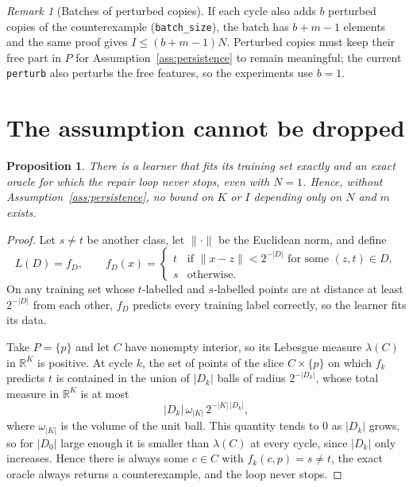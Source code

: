 \documentclass[11pt]{article}
\newtheorem{proposition}[theorem]{Proposition}
\theoremstyle{definition}
\theoremstyle{remark}
\newtheorem{remark}[theorem]{Remark}
\newcommand{\R}{\mathbb{R}}
\begin{document}
\begin{remark}[Batches of perturbed copies]
If each cycle also adds $b$ perturbed copies of the counterexample (\texttt{batch\_size}),
the batch has $b+m-1$ elements and the same proof gives $I\le(b+m-1)N$.
Perturbed copies must keep their free part in $P$ for Assumption~\ref{ass:persistence} to
remain meaningful; the current \texttt{perturb} also perturbs the free features, so the
experiments use $b=1$.
\end{remark}

\section{The assumption cannot be dropped}

\begin{proposition}\label{prop:nobound}
There is a learner that fits its training set exactly and an exact oracle for which the
repair loop never stops, even with $N=1$.
Hence, without Assumption~\ref{ass:persistence}, no bound on $K$ or $I$ depending only on
$N$ and $m$ exists.
\end{proposition}

\begin{proof}
Let $s\ne t$ be another class, let $\|\cdot\|$ be the Euclidean norm, and define
\[
  L(D)=f_D,\qquad
  f_D(x)=\begin{cases}
    t & \text{if } \|x-z\|<2^{-|D|} \text{ for some } (z,t)\in D,\\
    s & \text{otherwise.}
  \end{cases}
\]
On any training set whose $t$-labelled and $s$-labelled points are at distance at least
$2^{-|D|}$ from each other, $f_D$ predicts every training label correctly, so the
learner fits its data.

Take $P=\{p\}$ and let $C$ have nonempty interior, so its Lebesgue measure $\lambda(C)$ in
$\R^{K}$ is positive.
At cycle $k$, the set of points of the slice $C\times\{p\}$ on which $f_k$ predicts $t$ is
contained in the union of $|D_k|$ balls of radius $2^{-|D_k|}$, whose total measure in
$\R^{K}$ is at most
\[
  |D_k|\,\omega_{|K|}\,2^{-|K|\,|D_k|},
\]
where $\omega_{|K|}$ is the volume of the unit ball.
This quantity tends to $0$ as $|D_k|$ grows, so for $|D_0|$ large enough it is smaller
than $\lambda(C)$ at every cycle, since $|D_k|$ only increases.
Hence there is always some $c\in C$ with $f_k(c,p)=s\ne t$, the exact oracle always
returns a counterexample, and the loop never stops.
\end{proof}
\end{document}
